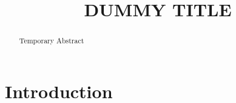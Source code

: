 \documentclass[letterpaper, 10pt, conference]{IEEEtran}
\title{DUMMY TITLE}
\author{\IEEEauthorblockN{Mason U'Ren}
	\IEEEauthorblockA{Compuer Science, 
		CSU Channel Islands\\}}
\begin{document}
	


\maketitle

\begin{abstract}
Temporary Abstract
\end{abstract}


\section{Introduction}





\end{document}
